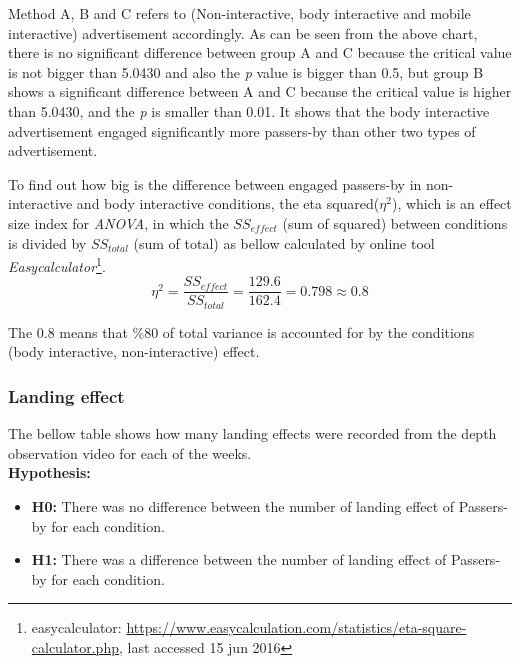 Method A, B and C refers to (Non-interactive, body interactive and mobile interactive) advertisement accordingly. As can be seen from the above chart, there is no significant difference between group A and C because the critical value is not bigger than 5.0430 and also the \emph{p} value is bigger than 0.5, but group B shows a significant difference between A and C because the critical value is higher than 5.0430, and the \emph{p} is smaller than 0.01. It shows that the body interactive advertisement engaged significantly more passers-by than other two types of advertisement.

To find out how big is the difference between engaged passers-by in non-interactive and body interactive conditions, the eta squared(${\eta}^2$), which is an effect size index for \emph{ANOVA}, in which the $SS_{effect}$ (sum of squared) between conditions is divided by $SS_{total}$  (sum of total) as bellow calculated by online tool \emph{Easycalculator}\footnote{easycalculator: \url{https://www.easycalculation.com/statistics/eta-square-calculator.php}, last accessed 15 jun 2016}.
\[
{\eta}^2 = \frac{{SS}_{effect}}{{SS}_{total}} = \frac{129.6}{162.4} = 0.798 \approx 0.8
\]

The 0.8 means that \%80 of total variance is accounted for by the conditions (body interactive, non-interactive) effect. 


\subsubsection {Landing effect}
The bellow table shows how many landing effects were recorded from the depth observation video for each of the weeks.\\


\textbf{Hypothesis: }
\begin{itemize}
\item \textbf{H0:} There was no difference between the number of landing effect of Passers-by for each condition.
\item \textbf{H1:} There was a difference between the number of landing effect of Passers-by for each condition.
\end{itemize}

\begin{table}[H]
\caption{Number of Landing effect in three weeks}
\label{tab:landingeffectthreeweeks}
\centering
{}
\end{table}

